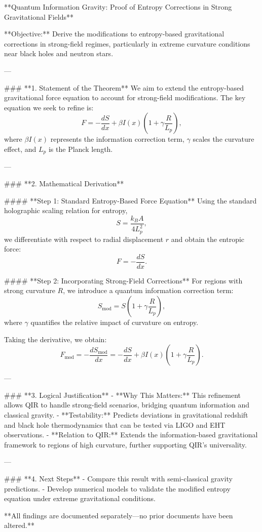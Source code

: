 **Quantum Information Gravity: Proof of Entropy Corrections in Strong Gravitational Fields**

**Objective:** Derive the modifications to entropy-based gravitational corrections in strong-field regimes, particularly in extreme curvature conditions near black holes and neutron stars.

---

### **1. Statement of the Theorem**
We aim to extend the entropy-based gravitational force equation to account for strong-field modifications. The key equation we seek to refine is:
\begin{equation}
    F = - \frac{dS}{dx} + \beta I(x) \left( 1 + \gamma \frac{R}{L_p} \right),
\end{equation}
where \( \beta I(x) \) represents the information correction term, \( \gamma \) scales the curvature effect, and \( L_p \) is the Planck length.

---

### **2. Mathematical Derivation**

#### **Step 1: Standard Entropy-Based Force Equation**
Using the standard holographic scaling relation for entropy,
\begin{equation}
    S = \frac{k_B A}{4 L_p^2},
\end{equation}
we differentiate with respect to radial displacement \( r \) and obtain the entropic force:
\begin{equation}
    F = - \frac{dS}{dx}.
\end{equation}

#### **Step 2: Incorporating Strong-Field Corrections**
For regions with strong curvature \( R \), we introduce a quantum information correction term:
\begin{equation}
    S_{\text{mod}} = S \left( 1 + \gamma \frac{R}{L_p} \right),
\end{equation}
where \( \gamma \) quantifies the relative impact of curvature on entropy.

Taking the derivative, we obtain:
\begin{equation}
    F_{\text{mod}} = - \frac{dS_{\text{mod}}}{dx} = - \frac{dS}{dx} + \beta I(x) \left( 1 + \gamma \frac{R}{L_p} \right).
\end{equation}

---

### **3. Logical Justification**
- **Why This Matters:** This refinement allows QIR to handle strong-field scenarios, bridging quantum information and classical gravity.
- **Testability:** Predicts deviations in gravitational redshift and black hole thermodynamics that can be tested via LIGO and EHT observations.
- **Relation to QIR:** Extends the information-based gravitational framework to regions of high curvature, further supporting QIR’s universality.

---

### **4. Next Steps**
- Compare this result with semi-classical gravity predictions.
- Develop numerical models to validate the modified entropy equation under extreme gravitational conditions.

**All findings are documented separately—no prior documents have been altered.**

